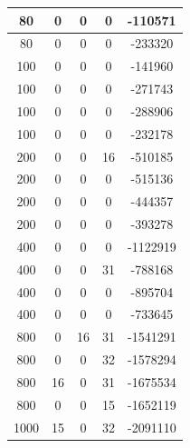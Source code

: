 \documentclass[a4paper]{article}
\begin{document}
\begin{table}[H]
\begin{minipage}[t]{10cm}
\begin{tabular}{|c|c|c|c|c|}
      80            & 0             & 0                   & 0                & -110571      \\ \hline
      80            & 0             & 0                   & 0                & -233320      \\ \hline
      100           & 0             & 0                   & 0                & -141960      \\ \hline
      100           & 0             & 0                   & 0                & -271743      \\ \hline
      100           & 0             & 0                   & 0                & -288906      \\ \hline
      100           & 0             & 0                   & 0                & -232178      \\ \hline
      200           & 0             & 0                   & 16               & -510185      \\ \hline
      200           & 0             & 0                   & 0                & -515136      \\ \hline
      200           & 0             & 0                   & 0                & -444357      \\ \hline
      200           & 0             & 0                   & 0                & -393278      \\ \hline
      400           & 0             & 0                   & 0                & -1122919     \\ \hline
      400           & 0             & 0                   & 31               & -788168      \\ \hline
      400           & 0             & 0                   & 0                & -895704      \\ \hline
      400           & 0             & 0                   & 0                & -733645      \\ \hline
      800           & 0             & 16                  & 31               & -1541291     \\ \hline
      800           & 0             & 0                   & 32               & -1578294     \\ \hline
      800           & 16            & 0                   & 31               & -1675534     \\ \hline
      800           & 0             & 0                   & 15               & -1652119     \\ \hline
      1000          & 15            & 0                   & 32               & -2091110     \\ \hline

\end{tabular}
\end{minipage}
\end{table}
\end{document}
